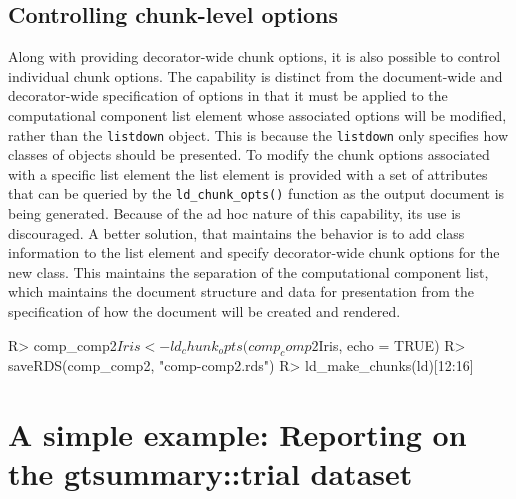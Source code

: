 \documentclass[
]{jss}
\begin{document}
\hypertarget{controlling-chunk-level-options}{%
\subsection{Controlling chunk-level
options}\label{controlling-chunk-level-options}}

Along with providing decorator-wide chunk options, it is also possible
to control individual chunk options. The capability is distinct from the
document-wide and decorator-wide specification of options in that it
must be applied to the computational component list element whose
associated options will be modified, rather than the \texttt{listdown}
object. This is because the \texttt{listdown} only specifies how classes
of objects should be presented. To modify the chunk options associated
with a specific list element the list element is provided with a set of
attributes that can be queried by the \texttt{ld\_chunk\_opts()}
function as the output document is being generated. Because of the ad
hoc nature of this capability, its use is discouraged. A better
solution, that maintains the behavior is to add class information to the
list element and specify decorator-wide chunk options for the new class.
This maintains the separation of the computational component list, which
maintains the document structure and data for presentation from the
specification of how the document will be created and rendered.

\begin{CodeChunk}

\begin{CodeInput}
R> comp_comp2$Iris <- ld_chunk_opts(comp_comp2$Iris, echo = TRUE)
R> saveRDS(comp_comp2, "comp-comp2.rds")
R> ld_make_chunks(ld)[12:16]
\end{CodeInput}

\end{CodeChunk}

\hypertarget{a-simple-example-reporting-on-the-gtsummarytrial-dataset}{%
\section{A simple example: Reporting on the gtsummary::trial
dataset}\label{a-simple-example-reporting-on-the-gtsummarytrial-dataset}}
\end{document}
